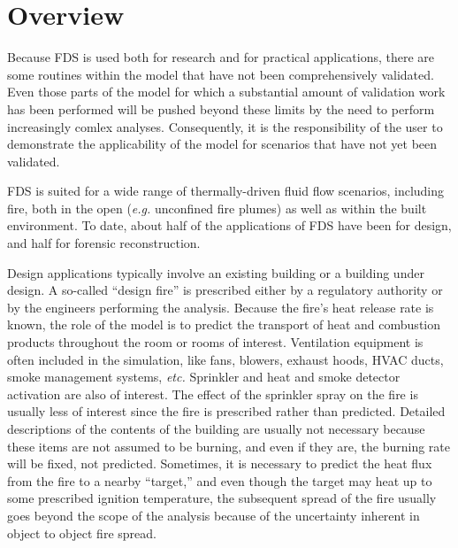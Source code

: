 
\chapter{Overview}

Because FDS is used both  for research and for practical applications,
there  are  some  routines  within   the  model  that  have  not  been
comprehensively validated. Even  those parts of the model  for which a
substantial  amount of  validation  work has  been  performed will  be
pushed beyond these limits by  the need to perform increasingly comlex
analyses.  Consequently,  it is  the  responsibility  of  the user  to
demonstrate the applicability of the model for scenarios that have not
yet been validated.

FDS  is  suited  for  a  wide range  of  thermally-driven  fluid  flow
scenarios,  including fire, both  in the  open ({\em  e.g.} unconfined
fire plumes) as  well as within the built  environment. To date, about
half of  the applications of  FDS have been  for design, and  half for
forensic reconstruction.

Design  applications  typically  involve  an existing  building  or  a
building  under  design. A  so-called  ``design  fire'' is  prescribed
either by  a regulatory authority  or by the engineers  performing the
analysis. Because the  fire's heat release rate is  known, the role of
the model is to predict  the transport of heat and combustion products
throughout  the room or  rooms of  interest. Ventilation  equipment is
often included  in the simulation, like fans,  blowers, exhaust hoods,
HVAC ducts,  smoke management systems,  {\em etc.} Sprinkler  and heat
and smoke detector activation are also of interest.  The effect of the
sprinkler spray on the fire is usually less of interest since the fire
is  prescribed rather  than  predicted. Detailed  descriptions of  the
contents of the building are usually not necessary because these items
are not assumed to be burning,  and even if they are, the burning rate
will be  fixed, not predicted.  Sometimes, it is necessary  to predict
the heat  flux from the fire  to a nearby ``target,''  and even though
the target  may heat up  to some prescribed ignition  temperature, the
subsequent spread  of the  fire usually goes  beyond the scope  of the
analysis because of the uncertainty  inherent in object to object fire
spread.

